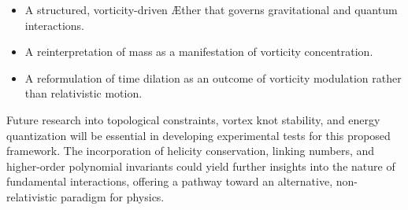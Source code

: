 \begin{itemize}
    \item A structured, vorticity-driven Æther that governs gravitational and quantum interactions.
    \item A reinterpretation of mass as a manifestation of vorticity concentration.
    \item A reformulation of time dilation as an outcome of vorticity modulation rather than relativistic motion.
\end{itemize}
Future research into topological constraints, vortex knot stability, and energy quantization will be essential in developing experimental tests for this proposed framework.
The incorporation of helicity conservation, linking numbers, and higher-order polynomial invariants could yield further insights into the nature of fundamental interactions, offering a pathway toward an alternative, non-relativistic paradigm for physics.
